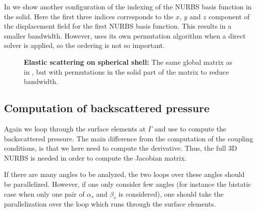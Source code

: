 In  we show another configuration of the indexing of the NURBS basis function in the solid. Here the first three indices corresponds to the $x$, $y$ and $z$ component of the displacement field for the first NURBS basis function. This results in a smaller bandwidth. However, \MATLAB uses its own permutation algorithm when a direct solver is applied, so the ordering is not so important.
\begin{figure}
	\centering
	\caption[Global matrix for elastic scattering on spherical shell with permutations]{\textbf{Elastic scattering on spherical shell:} The same global matrix as in , but with permutations in the solid part of the matrix to reduce bandwidth.}
	\label{Fig2:spyApermuted}
\end{figure}

\subsection{Computation of backscattered pressure}
Again we loop through the surface elements at $\Gamma$ and use  to compute the backscattered pressure. The main difference from the computation of the coupling conditions, is that we here need to compute the derivative. Thus, the full 3D NURBS is needed in order to compute the Jacobian matrix.

If there are many angles to be analyzed, the two loops over these angles should be parallelized. However, if one only consider few angles (for instance the bistatic case when only one pair of $\alpha_s$ and $\beta_s$ is considered), one should take the parallelization over the loop which runs through the surface elements.